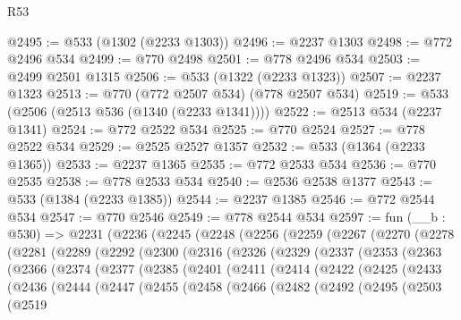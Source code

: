 \begin{lexlean}{R53}
\begin{coremodule}
@2495 := @533 (@1302 (@2233 @1303))
@2496 := @2237 @1303
@2498 := @772 @2496 @534
@2499 := @770 @2498
@2501 := @778 @2496 @534
@2503 := @2499 @2501 @1315
@2506 := @533 (@1322 (@2233 @1323))
@2507 := @2237 @1323
@2513 := @770 (@772 @2507 @534) (@778 @2507 @534)
@2519 := @533 (@2506 (@2513 @536 (@1340 (@2233 @1341))))
@2522 := @2513 @534 (@2237 @1341)
@2524 := @772 @2522 @534
@2525 := @770 @2524
@2527 := @778 @2522 @534
@2529 := @2525 @2527 @1357
@2532 := @533 (@1364 (@2233 @1365))
@2533 := @2237 @1365
@2535 := @772 @2533 @534
@2536 := @770 @2535
@2538 := @778 @2533 @534
@2540 := @2536 @2538 @1377
@2543 := @533 (@1384 (@2233 @1385))
@2544 := @2237 @1385
@2546 := @772 @2544 @534
@2547 := @770 @2546
@2549 := @778 @2544 @534
@2597 := fun (__b : @530) =>
  @2231
    (@2236
      (@2245
        (@2248
          (@2256
            (@2259
              (@2267
                (@2270
                  (@2278
                    (@2281
                      (@2289
                        (@2292
                          (@2300
                            (@2316
                              (@2326
                                (@2329
                                  (@2337
                                    (@2353
                                      (@2363
                                        (@2366
                                          (@2374
                                            (@2377
                                              (@2385
                                                (@2401
                                                  (@2411
                                                    (@2414
                                                      (@2422
                                                        (@2425
                                                          (@2433
                                                            (@2436
                                                              (@2444
                                                                (@2447
                                                                  (@2455
                                                                    (@2458
                                                                      (@2466
                                                                        (@2482
                                                                          (@2492
                                                                            (@2495
                                                                              (@2503
                                                                                (@2519

\end{coremodule}
\end{lexlean}
